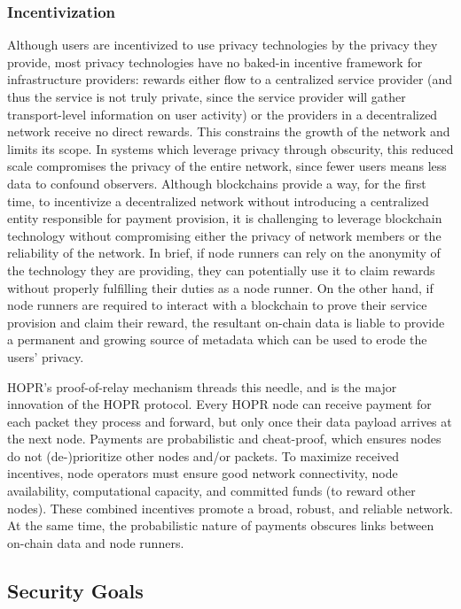 \subsubsection{Incentivization}
Although users are incentivized to use privacy technologies by the privacy they provide, most privacy technologies have no baked-in incentive framework for infrastructure providers: rewards either flow to a centralized service provider (and thus the service is not truly private, since the service provider will gather transport-level information on user activity) or the providers in a decentralized network receive no direct rewards. This constrains the growth of the network and limits its scope. In systems which leverage privacy through obscurity, this reduced scale compromises the privacy of the entire network, since fewer users means less data to confound observers. Although blockchains provide a way, for the first time, to incentivize a decentralized network without introducing a centralized entity responsible for payment provision, it is challenging to leverage blockchain technology without compromising either the privacy of network members or the reliability of the network. In brief, if node runners can rely on the anonymity of the technology they are providing, they can potentially use it to claim rewards without properly fulfilling their duties as a node runner. On the other hand, if node runners are required to interact with a blockchain to prove their service provision and claim their reward, the resultant on-chain data is liable to provide a permanent and growing source of metadata which can be used to erode the users' privacy.

HOPR's proof-of-relay mechanism threads this needle, and is the major innovation of the HOPR protocol. Every HOPR node can receive payment for each packet they process and forward, but only once their data payload arrives at the next node. Payments are probabilistic and cheat-proof, which ensures nodes do not (de-)prioritize other nodes and/or packets. To maximize received incentives, node operators must ensure good network connectivity, node availability, computational capacity, and committed funds (to reward other nodes). These combined incentives promote a broad, robust, and reliable network. At the same time, the probabilistic nature of payments obscures links between on-chain data and node runners.



\subsection{Security Goals}
\label{sec:securitygoals}

